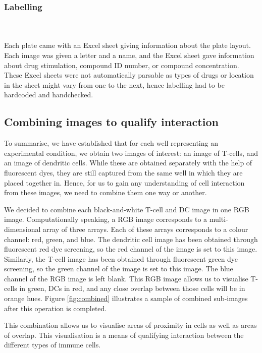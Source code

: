 \bigskip
\subsubsection{Labelling}

\hfill\\
\hfill\\
Each plate came with an Excel sheet giving information about the plate layout. Each image was given a letter and a name, and the Excel sheet gave information about drug stimulation, compound ID number, or compound concentration. These Excel sheets were not automatically parsable as types of drugs or location in the sheet might vary from one to the next, hence labelling had to be hardcoded and handchecked.

\subsection{Combining images to qualify interaction} \label{subsec:combining}

To summarise, we have established that for each well representing an experimental condition, we obtain two images of interest: an image of T-cells, and an image of dendritic cells. While these are obtained separately with the help of fluorescent dyes, they are still captured from the same well in which they are placed together in. Hence, for us to gain any understanding of cell interaction from these images, we need to combine them one way or another.

We decided to combine each black-and-white T-cell and DC image in one RGB image. Computationally speaking, a RGB image corresponds to a multi-dimensional array of three arrays. Each of these arrays corresponds to a colour channel: red, green, and blue. The dendritic cell image has been obtained through fluorescent red dye screening, so the red channel of the image is set to this image. Similarly, the T-cell image has been obtained through fluorescent green dye screening, so the green channel of the image is set to this image. The blue channel of the RGB image is left blank. This RGB image allows us to visualise T-cells in green, DCs in red, and any close overlap between those cells will be in orange hues. Figure \ref{fig:combined} illustrates a sample of combined sub-images after this operation is completed.

This combination allows us to visualise areas of proximity in cells as well as areas of overlap. This visualisation is a means of qualifying interaction between the different types of immune cells.

